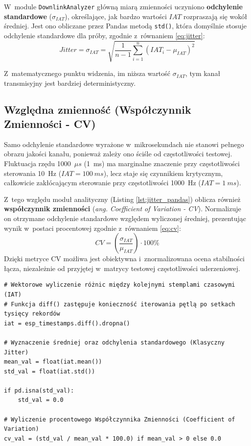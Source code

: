 W~module \texttt{DownlinkAnalyzer} główną miarą zmienności uczyniono \textbf{odchylenie standardowe} ($\sigma_{IAT}$), określające, jak bardzo wartości $IAT$ rozpraszają się wokół średniej.
Jest ono obliczane przez Pandas metodą \texttt{std()}, która domyślnie stosuje odchylenie standardowe dla próby, zgodnie z~równaniem \ref{eq:jitter}:
\begin{equation}
    Jitter = \sigma_{IAT} = \sqrt{\frac{1}{n-1} \sum_{i=1}^{n} (IAT_i - \mu_{IAT})^2} \label{eq:jitter} \end{equation}

Z~matematycznego punktu widzenia, im niższa wartość $\sigma_{IAT}$, tym kanał transmisyjny jest bardziej deterministyczny.

\subsection{Względna zmienność (Współczynnik Zmienności - CV)}
Samo odchylenie standardowe wyrażone w~mikrosekundach nie stanowi pełnego obrazu jakości kanału, ponieważ zależy ono ściśle od częstotliwości testowej.
Fluktuacja rzędu 1000~$\mu s$ (1~ms) ma marginalne znaczenie przy częstotliwości sterowania 10~Hz ($IAT = 100~ms$), lecz staje się czynnikiem krytycznym, całkowicie zakłócającym sterowanie przy częstotliwości 1000~Hz ($IAT = 1~ms$).

Z~tego względu moduł analityczny (Listing \ref{lst:jitter_pandas}) oblicza również \textbf{współczynnik zmienności} (\textit{ang. Coefficient of Variation - CV}).
Normalizuje on otrzymane odchylenie standardowe względem wyliczonej średniej, prezentując wynik w~postaci procentowej zgodnie z~równaniem \ref{eq:cv}:
\begin{equation}
    CV = \left( \frac{\sigma_{IAT}}{\mu_{IAT}} \right) \cdot 100\% \label{eq:cv} \end{equation} Dzięki metryce CV możliwa jest obiektywna i~znormalizowana ocena stabilności łącza, niezależnie od przyjętej w~matrycy testowej częstotliwości uderzeniowej.

\begin{listing}[htbp]
    \caption{Wektorowe wyznaczanie wektora IAT i~znormalizowanego współczynnika Jittera za pomocą silnika Pandas (\texttt{jitter.py}) \cite{espy_nexus_python_host}.}
    \label{lst:jitter_pandas}
    \begin{verbatim}
# Wektorowe wyliczenie różnic między kolejnymi stemplami czasowymi (IAT)
# Funkcja diff() zastępuje konieczność iterowania pętlą po setkach tysięcy rekordów
iat = esp_timestamps.diff().dropna()

# Wyznaczenie średniej oraz odchylenia standardowego (Klasyczny Jitter)
mean_val = float(iat.mean())
std_val = float(iat.std())

if pd.isna(std_val):
    std_val = 0.0

# Wyliczenie procentowego Współczynnika Zmienności (Coefficient of Variation)
cv_val = (std_val / mean_val * 100.0) if mean_val > 0 else 0.0
\end{verbatim}
\end{listing}

